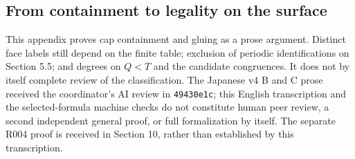 \documentclass[11pt]{amsart}
\newcommand{\record}[1]{\nolinkurl{#1}}
\begin{document}
\subsection{From containment to legality on the surface}
This appendix proves cap containment and gluing as a prose argument.
Distinct face labels still depend on the finite table; exclusion of
periodic identifications on Section 5.5; and degrees on $Q<T$ and the
candidate congruences. It does not by itself complete review of the
classification. The Japanese v4 B and C prose received the coordinator's
AI review in \record{49430e1c}; this English transcription and the
selected-formula machine checks do not constitute human peer review,
a second independent general proof, or full formalization by itself. The separate
R004 proof is received in Section 10, rather than established by this
transcription.
\end{document}
